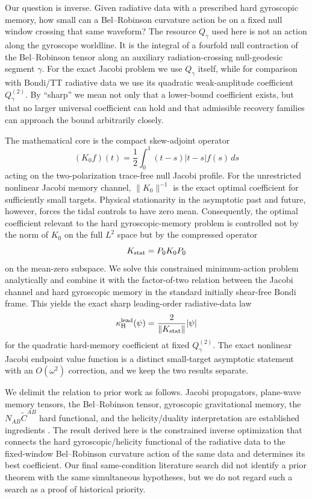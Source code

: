 Our question is inverse. Given radiative data with a prescribed hard gyroscopic memory, how small can a Bel--Robinson curvature action be on a fixed null window crossing that same waveform? The resource $Q_\gamma$ used here is not an action along the gyroscope worldline. It is the integral of a fourfold null contraction of the Bel--Robinson tensor along an auxiliary radiation-crossing null-geodesic segment $\gamma$. For the exact Jacobi problem we use $Q_\gamma$ itself, while for comparison with Bondi/TT radiative data we use its quadratic weak-amplitude coefficient $Q_\gamma^{(2)}$. By ``sharp'' we mean not only that a lower-bound coefficient exists, but that no larger universal coefficient can hold and that admissible recovery families can approach the bound arbitrarily closely.

The mathematical core is the compact skew-adjoint operator
\[
(K_0f)(t)=\frac12\int_0^1(t-s)|t-s|f(s)\,ds
\]
acting on the two-polarization trace-free null Jacobi profile. For the unrestricted nonlinear Jacobi memory channel, $\|K_0\|^{-1}$ is the exact optimal coefficient for sufficiently small targets. Physical stationarity in the asymptotic past and future, however, forces the tidal controls to have zero mean. Consequently, the optimal coefficient relevant to the hard gyroscopic-memory problem is controlled not by the norm of $K_0$ on the full $L^2$ space but by the compressed operator
\[
K_{\rm stat}=P_0K_0P_0
\]
on the mean-zero subspace. We solve this constrained minimum-action problem analytically and combine it with the factor-of-two relation between the Jacobi channel and hard gyroscopic memory in the standard initially shear-free Bondi frame. This yields the exact sharp leading-order radiative-data law
\[
\kappa_{\rm H}^{\rm lead}(\psi)=\frac{2}{\|K_{\rm stat}\|}|\psi|
\]
for the quadratic hard-memory coefficient at fixed $Q_\gamma^{(2)}$. The exact nonlinear Jacobi endpoint value function is a distinct small-target asymptotic statement with an $O(\omega^2)$ correction, and we keep the two results separate.

We delimit the relation to prior work as follows. Jacobi propagators, plane-wave memory tensors, the Bel--Robinson tensor, gyroscopic gravitational memory, the $N_{AB}\widetilde C^{AB}$ hard functional, and the helicity/duality interpretation are established ingredients \cite{Flanagan2020,Harte2025,SerajOblak2023,FayeSeraj2025}. The result derived here is the constrained inverse optimization that connects the hard gyroscopic/helicity functional of the radiative data to the fixed-window Bel--Robinson curvature action of the same data and determines its best coefficient. Our final same-condition literature search did not identify a prior theorem with the same simultaneous hypotheses, but we do not regard such a search as a proof of historical priority.

